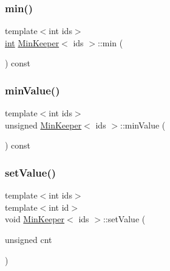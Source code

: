 \subsubsection{\texorpdfstring{min()}{min()}}
{\footnotesize\ttfamily template$<$int ids$>$ \\
\hyperlink{ioapi_8h_a787fa3cf048117ba7123753c1e74fcd6}{int} \hyperlink{classMinKeeper}{Min\+Keeper}$<$ ids $>$\+::min (\begin{DoxyParamCaption}{ }\end{DoxyParamCaption}) const\hspace{0.3cm}{\ttfamily [inline]}}

\mbox{\label{classMinKeeper_a92eb88a85193e36452c4b321ed7db903}} 
\subsubsection{\texorpdfstring{min\+Value()}{minValue()}}
{\footnotesize\ttfamily template$<$int ids$>$ \\
unsigned \hyperlink{classMinKeeper}{Min\+Keeper}$<$ ids $>$\+::min\+Value (\begin{DoxyParamCaption}{ }\end{DoxyParamCaption}) const\hspace{0.3cm}{\ttfamily [inline]}}

\mbox{\label{classMinKeeper_ab74f92c2bfad235b0663a3765a716dab}} 
\subsubsection{\texorpdfstring{set\+Value()}{setValue()}\hspace{0.1cm}{\footnotesize\ttfamily [1/2]}}
{\footnotesize\ttfamily template$<$int ids$>$ \\
template$<$int id$>$ \\
void \hyperlink{classMinKeeper}{Min\+Keeper}$<$ ids $>$\+::set\+Value (\begin{DoxyParamCaption}\item[{unsigned}]{cnt }\end{DoxyParamCaption})\hspace{0.3cm}{\ttfamily [inline]}}

